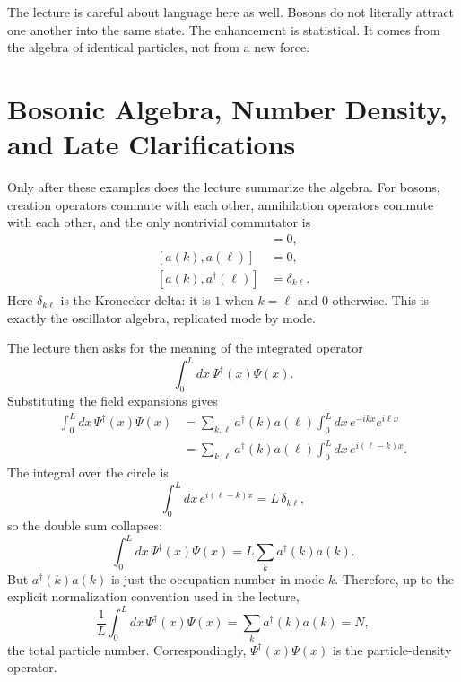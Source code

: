 The lecture is careful about language here as well. Bosons do not literally attract one another into the same state. The enhancement is statistical. It comes from the algebra of identical particles, not from a new force.

\section{Bosonic Algebra, Number Density, and Late Clarifications}

Only after these examples does the lecture summarize the algebra. For bosons, creation operators commute with each other, annihilation operators commute with each other, and the only nontrivial commutator is
\begin{align}
[a^\dagger(k),a^\dagger(\ell)] &= 0,
\\
[a(k),a(\ell)] &= 0,
\\
[a(k),a^\dagger(\ell)] &= \delta_{k\ell}.
\end{align}
Here \(\delta_{k\ell}\) is the Kronecker delta: it is \(1\) when \(k=\ell\) and \(0\) otherwise. This is exactly the oscillator algebra, replicated mode by mode.

The lecture then asks for the meaning of the integrated operator
\begin{equation}
\int_0^L dx\,\Psi^\dagger(x)\Psi(x).
\end{equation}
Substituting the field expansions gives
\begin{align}
\int_0^L dx\,\Psi^\dagger(x)\Psi(x)
&=
\sum_{k,\ell}
a^\dagger(k)a(\ell)
\int_0^L dx\,e^{-ikx}e^{i\ell x}
\\
&=
\sum_{k,\ell}
a^\dagger(k)a(\ell)
\int_0^L dx\,e^{i(\ell-k)x}.
\end{align}
The integral over the circle is
\begin{equation}
\int_0^L dx\,e^{i(\ell-k)x}=L\,\delta_{k\ell},
\end{equation}
so the double sum collapses:
\begin{equation}
\int_0^L dx\,\Psi^\dagger(x)\Psi(x)
=
L\sum_k a^\dagger(k)a(k).
\end{equation}
But \(a^\dagger(k)a(k)\) is just the occupation number in mode \(k\). Therefore, up to the explicit normalization convention used in the lecture,
\begin{equation}
\frac{1}{L}\int_0^L dx\,\Psi^\dagger(x)\Psi(x)
=
\sum_k a^\dagger(k)a(k)
=
N,
\end{equation}
the total particle number. Correspondingly, \(\Psi^\dagger(x)\Psi(x)\) is the particle-density operator.


